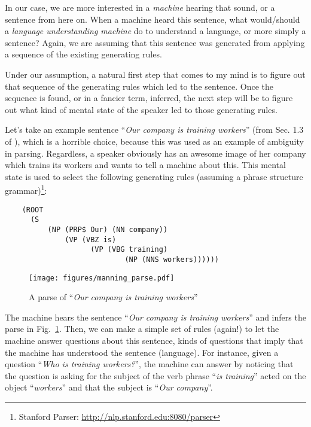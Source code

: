 \documentclass{report}
\begin{document}
In our case, we are more interested in a {\it machine} hearing that sound, or a
sentence from here on. When a machine heard this sentence, what would/should a
{\it language understanding machine} do to understand a language, or more simply
a sentence? Again, we are assuming that this sentence was generated from
applying a sequence of the existing generating rules. 

Under our assumption, a natural first step that comes to my mind is to figure
out that sequence of the generating rules which led to the sentence. Once the
sequence is found, or in a fancier term, inferred, the next step will be to
figure out what kind of mental state of the speaker led to those generating
rules. 

Let's take an example sentence ``{\it Our company is training workers}'' (from
Sec. 1.3 of \cite{manning1999foundations}), which is a horrible choice, because
this was used as an example of ambiguity in parsing. Regardless, a speaker
obviously has an awesome image of her company which trains its workers and wants
to tell a machine about this. This mental state is used to select the following
generating rules (assuming a phrase structure grammar)\footnote{
    Stanford Parser: \url{http://nlp.stanford.edu:8080/parser}
}:
\begin{verbatim}
    (ROOT
      (S
          (NP (PRP$ Our) (NN company))
              (VP (VBZ is)
                    (VP (VBG training)
                            (NP (NNS workers))))))
\end{verbatim}

\begin{figure}[ht]
    \centering
    \texttt{[image: figures/manning\_parse.pdf]}
    \caption{A parse of ``{\it Our company is training workers}''}
    \label{fig:manning_parse}
\end{figure}

The machine hears the sentence ``{\it Our company is training workers}'' and
infers the parse in Fig.~\ref{fig:manning_parse}. Then, we can make a simple set
of rules (again!) to let the machine answer questions about this sentence, kinds
of questions that imply that the machine has understood the sentence (language).
For instance, given a question ``{\it Who is training workers?}'', the machine
can answer by noticing that the question is asking for the subject of the verb
phrase
``{\it is training}'' acted on the object ``{\it workers}'' and that the subject
is ``{\it Our company}''.
\end{document}
